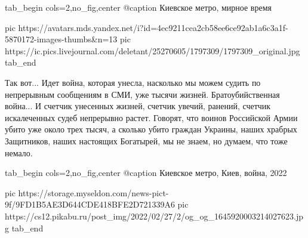 \ifcmt
  tab_begin cols=2,no_fig,center
		 @caption Киевское метро, мирное время

     pic https://avatars.mds.yandex.net/i?id=4ec9211cea2cb58ee6ce92ab1a6c3a1f-5870172-images-thumbs&n=13
		 pic https://ic.pics.livejournal.com/deletant/25270605/1797309/1797309_original.jpg
  tab_end
\fi

Так вот... Идет война, которая унесла, насколько мы можем судить по непрерывным
сообщениям в СМИ, уже тысячи жизней. Братоубийственная война... И счетчик
унесенных жизней, счетчик увечий, ранений, счетчик искалеченных судеб
непрерывно растет. Говорят, что воинов Российской Армии убито уже около трех
тысяч, а сколько убито граждан Украины, наших храбрых Защитников, наших
настоящих Богатырей, мы не знаем, но думаем, что тоже немало. 

\ifcmt
  tab_begin cols=2,no_fig,center
		 @caption Киевское метро, Киев, война, 2022

		 pic https://storage.myseldon.com/news-pict-9f/9FD1B5AE3D644CDE418BFE2D721339A6
     pic https://cs12.pikabu.ru/post_img/2022/02/27/2/og_og_1645920003214027623.jpg
  tab_end
\fi

